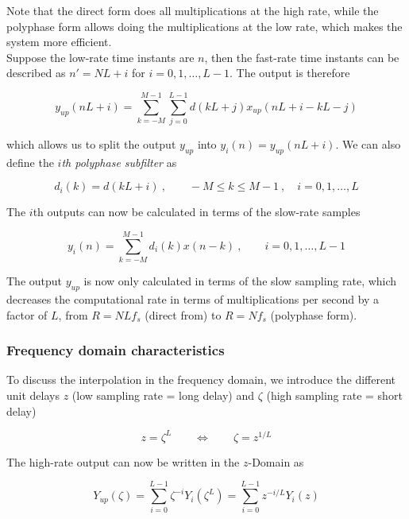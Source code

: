 Note that the direct form does all multiplications at the high rate, while
the polyphase form allows doing the multiplications at the low rate, which
makes the system more efficient. \\

Suppose the low-rate time instants are $n$, then the fast-rate time instants
can be described as $n' = NL+i$ for $i=0,1,\ldots,L-1$. The output is therefore

\begin{equation*}
	y_{up}(nL+i) = \sum\limits_{k=-M}^{M-1}\sum\limits_{j=0}^{L-1} d(kL+j) x_{up}(nL+i-kL-j)
\end{equation*}

which allows us to split the output $y_{up}$ into $y_i(n)=y_{up}(nL+i)$. 
We can also define the \emph{$i$th polyphase subfilter} as

\begin{equation*}
	d_i(k) = d(kL+i) \:,\qquad -M \leq k \leq M-1 \:,\quad i=0,1,\ldots,L
\end{equation*}

The $i$th outputs can now be calculated in terms of the slow-rate samples

\begin{equation*}
	y_i(n) = \sum\limits_{k=-M}^{M-1}d_i(k) x(n-k) \:,\qquad i=0,1,\ldots,L-1
\end{equation*}

The output $y_{up}$ is now only calculated in terms of the slow sampling rate,
which decreases the computational rate in terms of multiplications per second by
a factor of $L$, from $R = NLf_s$ (direct from) to $R = Nf_s$ (polyphase form). 


\subsubsection{Frequency domain characteristics}
To discuss the interpolation in the frequency domain, we introduce the different
unit delays $z$ (low sampling rate = long delay) and $\zeta$ 
(high sampling rate = short delay)

\begin{equation*}
	z = \zeta^L \qquad \Leftrightarrow \qquad \zeta = z^{1/L}
\end{equation*}

The high-rate output can now be written in the $z$-Domain as

\begin{equation*}
	Y_{up}(\zeta) = \sum\limits_{i=0}^{L-1} \zeta^{-i} Y_i(\zeta^L)
	= \sum\limits_{i=0}^{L-1} z^{-i/L} Y_i(z)
\end{equation*}


